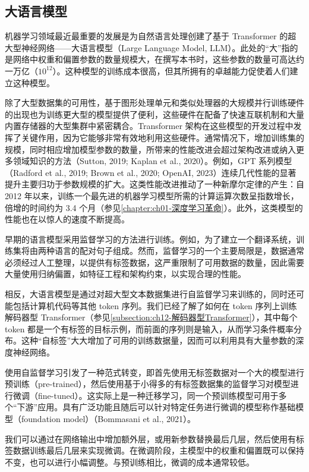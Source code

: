\documentclass[../../main.tex]{subfiles}
\begin{document}
\subsection{大语言模型}\label{subsection:ch12-大语言模型}

机器学习领域最近最重要的发展是为自然语言处理创建了基于 Transformer 的超大型神经网络——大语言模型（Large Language Model, LLM）。此处的“大”指的是网络中权重和偏置参数的数量规模大，在撰写本书时，这些参数的数量可高达约一万亿（$10^{12}$）。这种模型的训练成本很高，但其所拥有的卓越能力促使着人们建立这种模型。

除了大型数据集的可用性，基于图形处理单元和类似处理器的大规模并行训练硬件的出现也为训练更大型的模型提供了便利，这些硬件在配备了快速互联机制和大量内置存储器的大型集群中紧密耦合。Transformer 架构在这些模型的开发过程中发挥了关键作用，因为它能够非常有效地利用这些硬件。通常情况下，增加训练集的规模，同时相应增加模型参数的数量，所带来的性能改进会超过架构改进或纳入更多领域知识的方法（Sutton, 2019; Kaplan et al., 2020）。例如，GPT 系列模型（Radford et al., 2019; Brown et al., 2020; OpenAI, 2023）连续几代性能的显著提升主要归功于参数规模的扩大。这类性能改进推动了一种新摩尔定律的产生：自 2012 年以来，训练一个最先进的机器学习模型所需的计算运算次数呈指数增长，倍增的时间约为 3.4 个月（参见\cref{chapter:ch01-深度学习革命}）。此外，这类模型的性能也在以惊人的速度不断提高。

早期的语言模型采用监督学习的方法进行训练。例如，为了建立一个翻译系统，训练集将由两种语言的配对句子组成。然而，监督学习的一个主要局限是，数据通常必须经过人工整理，以提供有标签数据，这严重限制了可用数据的数量，因此需要大量使用归纳偏置，如特征工程和架构约束，以实现合理的性能。

相反，大语言模型是通过对超大型文本数据集进行自监督学习来训练的，同时还可能包括计算机代码等其他 token 序列。我们已经了解了如何在 token 序列上训练解码器型 Transformer（参见\cref{subsection:ch12-解码器型Transformer}），其中每个 token 都是一个有标签的目标示例，而前面的序列则是输入，从而学习条件概率分布。这种“自标签”大大增加了可用的训练数据量，因而可以利用具有大量参数的深度神经网络。

使用自监督学习引发了一种范式转变，即首先使用无标签数据对一个大的模型进行预训练（pre-trained），然后使用基于小得多的有标签数据集的监督学习对模型进行微调（fine-tuned）。这实际上是一种迁移学习，同一个预训练模型可用于多个“下游”应用。具有广泛功能且随后可以针对特定任务进行微调的模型称作基础模型（foundation model）（Bommasani et al., 2021）。

我们可以通过在网络输出中增加额外层，或用新参数替换最后几层，然后使用有标签数据训练最后几层来实现微调。在微调阶段，主模型中的权重和偏置既可以保持不变，也可以进行小幅调整。与预训练相比，微调的成本通常较低。
\end{document}
